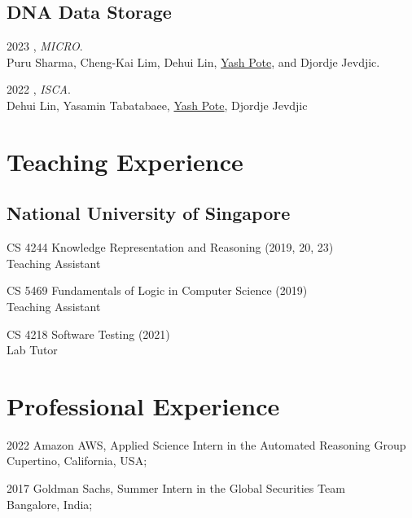 \documentclass[12pt,letterpaper]{report}
\begin{document}
	\subsection*{DNA Data Storage}
	\begin{tablist}
		
		\item[2023] , \textit{MICRO}.\\
		Puru Sharma, Cheng-Kai Lim, Dehui Lin, \underline{Yash Pote}, and Djordje Jevdjic.
		
		\item[2022] , \textit{ISCA}.\\
		Dehui Lin, Yasamin Tabatabaee, \underline{Yash Pote}, Djordje Jevdjic
		
	\end{tablist}
	
	
	
	\section*{Teaching Experience}
	
	\subsection*{National University of Singapore}
	\begin{tablist}
		
		
		
		\item[CS 4244] \tab Knowledge Representation and Reasoning (2019, 20, 23) \\Teaching Assistant
		\item[CS 5469] \tab Fundamentals of Logic in Computer Science (2019) \\ Teaching Assistant
		\item[CS 4218] \tab  Software Testing (2021) \\
		Lab Tutor
	\end{tablist}
	
	\section*{Professional Experience}
	\begin{tablist}
		\item[2022] \tab Amazon AWS, Applied Science Intern in the Automated Reasoning Group\\
		Cupertino, California, USA;
	\end{tablist}
	\begin{tablist}
		\item[2017] \tab Goldman Sachs, Summer Intern in the Global Securities Team\\
		Bangalore, India;
	\end{tablist}
	
\end{document}
